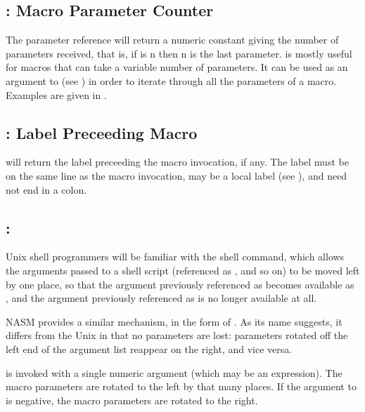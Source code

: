 \subsection{: Macro Parameter Counter}
\label{subsec:percent0}

The parameter reference  will return a numeric constant giving the
number of parameters received, that is, if  is n then \code{\%}n
is the last parameter.  is mostly useful for macros that can take a variable
number of parameters. It can be used as an argument to 
(see ) in order to iterate through all the parameters
of a macro. Examples are given in .

\subsection{: Label Preceeding Macro}
\label{subsec:percent00}

 will return the label preceeding the macro invocation, if any. The
label must be on the same line as the macro invocation, may be a local label
(see ), and need not end in a colon.

\subsection{: }
\label{subsec:rotate}

Unix shell programmers will be familiar with the  shell command, which allows the arguments passed
to a shell script (referenced as ,  and so on) to be
moved left by one place, so that the argument previously referenced
as  becomes available as , and the argument previously
referenced as  is no longer available at all.

NASM provides a similar mechanism, in the form of . As
its name suggests, it differs from the Unix  in that no
parameters are lost: parameters rotated off the left end of the
argument list reappear on the right, and vice versa.

 is invoked with a single numeric argument (which may be
an expression). The macro parameters are rotated to the left by that
many places. If the argument to  is negative, the macro
parameters are rotated to the right.

